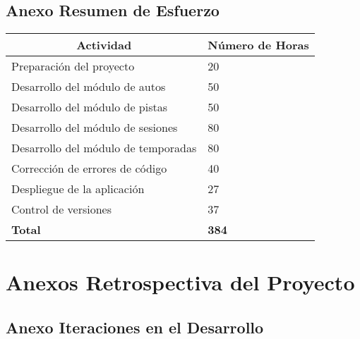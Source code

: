 \subsection{Anexo Resumen de Esfuerzo}
\begin{center}
  \begin{tabular}{ | p{10cm} | p{5cm} |}
    \hline
    \multicolumn{1}{|c|}{\textbf{Actividad}} & \multicolumn{1}{|c|}{\textbf{Número de Horas}} \\
    \hline
    
    {Preparación del proyecto} & {20} \\ \hline
    {Desarrollo del módulo de autos} & {50} \\ \hline
    {Desarrollo del módulo de pistas} & {50} \\ \hline
    {Desarrollo del módulo de sesiones} & {80} \\ \hline
    {Desarrollo del módulo de temporadas} & {80} \\ \hline
    {Corrección de errores de código} & {40} \\ \hline
    {Despliegue de la aplicación} & {27} \\ \hline
    {Control de versiones} & {37} \\ \hline
    
    {\textbf{Total}} & {\textbf{384}} \\

    \hline
  \end{tabular}
\end{center}

\newpage

\section{Anexos Retrospectiva del Proyecto}

\subsection{Anexo Iteraciones en el Desarrollo}

